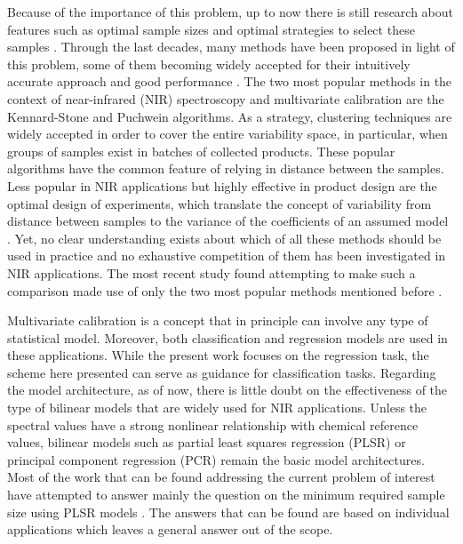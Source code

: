 \documentclass[journal=ancham,manuscript=article]{achemso}
\begin{document}
Because of the importance of this problem, up to now there is still research about features such as optimal sample sizes and optimal strategies to select these samples \cite{Au2020, Liu2019}. Through the last decades, many methods have been proposed in light of this problem, some of them becoming widely accepted for their intuitively accurate approach and good performance \cite{Shetty2012a, Nawar2018, He2015}. The two most popular methods in the context of near-infrared (NIR) spectroscopy and multivariate calibration are the Kennard-Stone\cite{Kennard1969} and  Puchwein\cite{Puchwein1988} algorithms. As a strategy, clustering techniques are widely accepted in order to cover the entire variability space\cite{Naes1990}, in particular, when groups of samples exist in batches of collected products\cite{Bobelyn2010}. These popular algorithms have the common feature of relying in distance between the samples. Less popular in NIR applications but highly effective in product design are the optimal design of experiments, which translate the concept of variability from distance between samples to the variance of the coefficients of an assumed model \cite{Goos2011}. Yet, no clear understanding exists about which of all these methods should be used in practice and no exhaustive competition of them has been investigated in NIR applications. The most recent study found attempting to make such a comparison made use of only the two most popular methods mentioned before \cite{Au2020}.

Multivariate calibration is a concept that in principle can involve any type of statistical model. Moreover, both classification and regression models are used in these applications. While the present work focuses on the regression task, the scheme here presented can serve as guidance for classification tasks. Regarding the model architecture, as of now, there is little doubt on the effectiveness of the type of bilinear models that are widely used for NIR applications. Unless the spectral values have a strong nonlinear relationship with chemical reference values, bilinear models such as partial least squares regression (PLSR) or principal component regression (PCR) remain the basic model architectures. Most of the work that can be found addressing the current problem of interest have attempted to answer mainly the question on the minimum required sample size using PLSR models \cite{Naes1990, Au2020, Shetty2012a, Rodionova2008}. The answers that can be found are based on individual applications which leaves a general answer out of the scope. 
\end{document}
